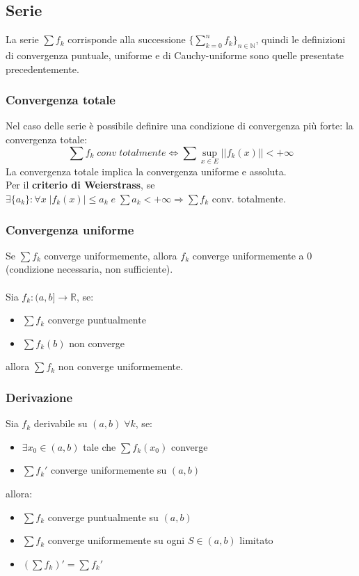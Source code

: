 \documentclass{article}
\newcommand{\R}{\mathds{R}}
\newcommand{\N}{\mathds{N}}
\begin{document}
\subsection{Serie}
La serie $\sum f_k$ corrisponde alla successione $\{\sum_{k=0}^nf_k\}_{n\in\N}$, quindi le definizioni di convergenza puntuale, uniforme e di Cauchy-uniforme sono quelle presentate precedentemente.

\subsubsection{Convergenza totale}
Nel caso delle serie è possibile definire una condizione di convergenza più forte: la convergenza totale:
$$\sum f_k\;conv\;totalmente\Leftrightarrow\sum\sup_{x\in E}||f_k(x)||<+\infty $$
La convergenza totale implica la convergenza uniforme e assoluta.\\
Per il \textbf{criterio di Weierstrass}, se $\exists \{a_k\}:\forall x\; |f_k(x)|\leq a_k\;e\;\sum a_k<+\infty\Rightarrow \sum f_k$ conv. totalmente.

\subsubsection{Convergenza uniforme}
Se $\sum f_k$ converge uniformemente, allora $f_k$ converge uniformemente a 0 (condizione necessaria, non sufficiente).\\\\
Sia $f_k:(a,b]\rightarrow\R$, se:
\begin{itemize}
    \item $\sum f_k$ converge puntualmente
    \item $\sum f_k(b)$ non converge
\end{itemize}
allora $\sum f_k$ non converge uniformemente.

\subsubsection{Derivazione}
Sia $f_k$ derivabile su $(a,b)\;\forall k$, se:
\begin{itemize}
    \item $\exists x_0\in(a,b)$ tale che $\sum f_k(x_0)$ converge
    \item $\sum f_k'$ converge uniformemente su $(a,b)$
\end{itemize}
allora:
\begin{itemize}
    \item $\sum f_k$ converge puntualmente su $(a,b)$
    \item $\sum f_k$ converge uniformemente su ogni $S\in(a,b)$ limitato
    \item $(\sum f_k)'=\sum f_k'$
\end{itemize}
\end{document}
